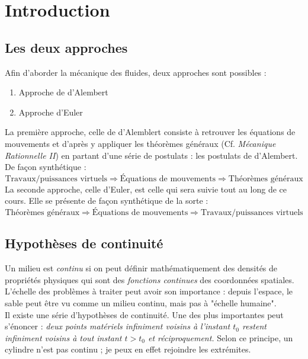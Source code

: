 \chapter{Introduction}

\section*{Les deux approches}
Afin d'aborder la mécanique des fluides, deux approches sont possibles :
\begin{enumerate}
	\item Approche de d'Alembert
	\item Approche d'Euler
\end{enumerate}
    
La première approche, celle de d'Alemblert consiste à retrouver les équations de mouvements
et d'après y appliquer les théorèmes généraux (Cf. \textit{Mécanique Rationnelle II}) en
partant d'une série de postulats : les postulats de d'Alembert. De façon synthétique :
$$ \text{Travaux/puissances virtuels}  \Rightarrow \text{Équations
	de mouvements} \Rightarrow \text{Théorèmes généraux}$$
La seconde approche, celle d'Euler, est celle qui sera suivie tout au long de ce cours. Elle
se présente de façon synthétique de la sorte :
$$ \text{Théorèmes généraux}  \Rightarrow \text{Équations
	de mouvements} \Rightarrow \text{Travaux/puissances virtuels}$$
    
    
\section*{Hypothèses de continuité}  
Un milieu est \textit{continu} si on peut définir mathématiquement des densités de propriétés
physiques qui sont des \textit{fonctions continues} des coordonnées spatiales.\\ L'échelle des
problèmes à traiter peut avoir son importance : depuis l'espace, le sable peut être vu comme
un milieu continu, mais pas à "échelle humaine".\\
    
Il existe une série d'hypothèses de continuité. Une des plus importantes peut s'énoncer : 
\textit{deux points matériels infiniment voisins à l'instant $t_0$ restent infiniment voisins
à tout instant $t > t_0$ et réciproquement.} Selon ce principe, un cylindre n'est pas continu ;
je peux en effet rejoindre les extrémites.\\
    
